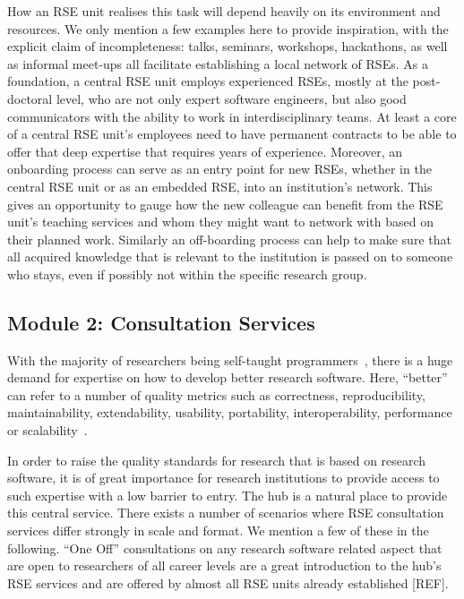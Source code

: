 \documentclass[a4paper]{article}
\makeatletter
\newcommand*{\eg}{e.\,g.\@\xspace}
\makeatother
\begin{document}
How an RSE unit realises this task will depend heavily on its environment and resources.
We only mention a few examples here to provide inspiration, with the explicit claim of incompleteness:
talks, seminars, workshops, hackathons, as well as informal meet-ups all facilitate establishing a local network of RSEs.
As a foundation, a central RSE unit employs experienced RSEs, mostly at the post-doctoral level, who are not only expert software engineers, but also good communicators with the ability to work in interdisciplinary teams.
At least a core of a central RSE unit's employees need to have permanent contracts to be able to offer that deep expertise that requires years of experience.
Moreover, an onboarding process can serve as an entry point for new RSEs, whether in the central RSE unit or as an embedded RSE, into an institution's network.
This gives an opportunity to gauge how the new colleague can benefit from the RSE unit's teaching services and whom they might want to network with based on their planned work.
Similarly an off-boarding process can help to make sure that all acquired knowledge that is relevant to the institution is passed on to someone who stays, even if possibly not within the specific research group.

\subsection{Module 2: Consultation Services}%
\label{sec:consultation}

With the majority of researchers being self-taught programmers~\autocite{Carver2013}, there is a huge demand for expertise on how to develop better research software.
Here, “better” can refer to a number of quality metrics such as correctness, reproducibility, maintainability, extendability, usability, portability, interoperability, performance or scalability~\autocite[Chapter 16]{Schulmeyer2008}.

In order to raise the quality standards for research that is based on research software, it is of great importance for research institutions to provide access to such expertise with a low barrier to entry.
The hub is a natural place to provide this central service.
There exists a number of scenarios where RSE consultation services differ strongly in scale and format.
We mention a few of these in the following.
“One Off” consultations on any research software related aspect that are open to researchers of all career levels are
a great introduction to the hub's RSE services and are offered by almost all RSE units already established [REF].
\end{document}
